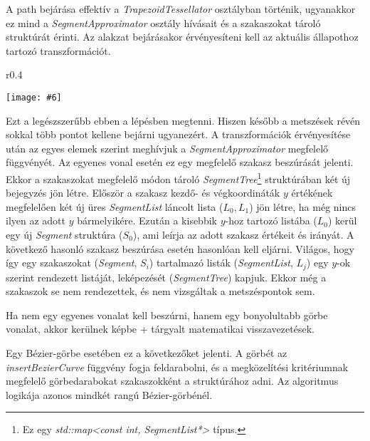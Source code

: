 \documentclass[12pt]{report}
\makeatletter
\theoremstyle{definition}
\newcommand{\func}[1]{{\textsl{#1}}}
\newcommand{\melyikoldalra}{r}
\newlength{\Xoffset}
\newlength{\Yoffset}
\newcommand*{\setpdfoffset}[2]{%
  \setlength{\Xoffset}{#1}%
  \setlength{\Yoffset}{#2}%
}
\newcommand*{\setviewport}[4]{%
  \def\x@viewport{%
    {\the\dimexpr#1-\Xoffset}
    {\the\dimexpr#2-\Yoffset}
    {\the\dimexpr#3-\Xoffset}
    {\the\dimexpr#4-\Yoffset}%
  }%
}
\newcommand{\includegraphicskivagas}[6]{
    \setpdfoffset{0pt}{0pt}
    \setviewport{#1}{#2}{#3}{#4}
    \texttt{[image: \#6]}
}
\newcommand{\includedataflowkivagas}[5]{
    \includegraphicskivagas{#1}{#2}{#3}{#4}{scale=0.6,#5}
    {img/built/dataflow_eps}
}
\makeatother
\begin{document}
A path bejárása effektív a \func{TrapezoidTessellator} osztályban történik,
ugyanakkor ez mind a \func{SegmentApproximator} osztály hívásait és a
szakaszokat tároló struktúrát érinti. Az alakzat bejárásakor érvényesíteni
kell az aktuális állapothoz tartozó transzformációt.
  \begin{wrapfigure}{\melyikoldalra}{0.4\textwidth}
    \begin{center}
      \includedataflowkivagas{345pt}{400pt}{525pt}{590pt}{}
    \end{center}
    \caption{\label{fig:dataflow-segment} A szakasszá alakítás és a megközelítő
    visszavezetések \\ (Részlet \az+\emph{\ref{appendix:dataflow}.
    folyamatábrából}.)}
  \end{wrapfigure}
Ezt a legészszerűbb ebben a lépésben megtenni. Hiszen később a metszések révén
sokkal több pontot kellene bejárni ugyanezért. A transzformációk érvényesítése
után az egyes elemek szerint meghívjuk a \func{SegmentApproximator} megfelelő
függvényét. Az egyenes vonal esetén ez egy megfelelő szakasz beszúrását
jelenti. Ekkor a szakaszokat megfelelő módon tároló
\func{SegmentTree}\footnote{Ez egy \func{std::map<const int, SegmentList*>}
típus.} struktúrában két új bejegyzés jön létre. Először a szakasz kezdő- és
végkoordináták $y$ értékének megfelelően két új üres \func{SegmentList} láncolt
lista ($L_0, L_1$) jön létre, ha még nincs ilyen az adott $y$ bármelyikére.
Ezután a kisebbik $y$-hoz tartozó listába ($L_0$) kerül egy új \func{Segment}
struktúra ($S_0$), ami leírja az adott szakasz értékeit és irányát. A következő
hasonló szakasz beszúrása esetén hasonlóan kell eljárni. Világos, hogy így egy
szakaszokat (\func{Segment}, $S_i$) tartalmazó listák (\func{SegmentList},
$L_j$) egy $y$-ok szerint rendezett listáját, leképezését (\func{SegmentTree})
kapjuk. Ekkor még a szakaszok se nem rendezettek, és nem vizsgáltak a
metszéspontok sem.

Ha nem egy egyenes vonalat kell beszúrni, hanem egy bonyolultabb görbe vonalat,
akkor kerülnek képbe \az+ tárgyalt matematikai
visszavezetések.

Egy Bézier-görbe esetében ez a következőket jelenti. A görbét az
\func{insertBezierCurve} függvény fogja feldarabolni, és a megközelítési
kritériumnak megfelelő görbedarabokat szakaszokként a struktúrához adni. Az
algoritmus logikája azonos mindkét rangú Bézier-görbénél.
\end{document}
